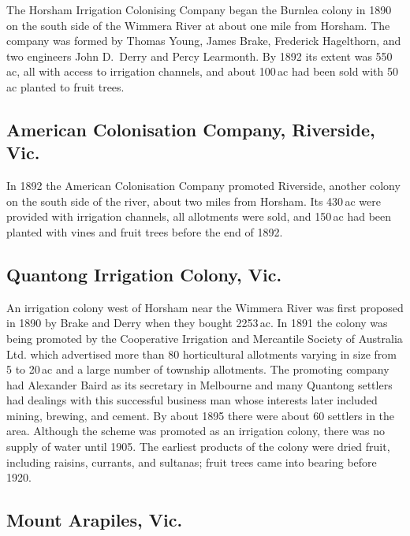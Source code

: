 The Horsham Irrigation Colonising Company began the Burnlea colony in
1890 on the south side of the Wimmera River at about one mile from
Horsham.  The company was formed by Thomas Young, James Brake,
Frederick Hagelthorn, and two engineers John D.~Derry and Percy
Learmonth.  By 1892 its extent was 550\,ac, all with access to
irrigation channels, and about 100\,ac had been sold with 50\,ac
planted to fruit trees.

\subsection*{American Colonisation Company, Riverside, Vic.}

In 1892 the American Colonisation Company promoted Riverside, another
colony on the south side of the river, about two miles from Horsham.
Its 430\,ac were provided with irrigation channels, all allotments
were sold, and 150\,ac had been planted with vines and fruit trees
before the end of 1892.

\subsection*{Quantong Irrigation Colony, Vic.}

An irrigation colony west of Horsham near the Wimmera River was first
proposed in 1890 by Brake and Derry when they bought 2253\,ac.  In
1891 the colony was being promoted by the Cooperative Irrigation and
Mercantile Society of Australia Ltd. which advertised more than 80
horticultural allotments varying in size from 5 to 20\,ac and a large
number of township allotments.  The promoting company had Alexander
Baird as its secretary in Melbourne and many Quantong settlers had
dealings with this successful business man whose interests later
included mining, brewing, and cement.  By about 1895 there were about
60 settlers in the area.  Although the scheme was promoted as an
irrigation colony, there was no supply of water until 1905.  The
earliest products of the colony were dried fruit, including raisins,
currants, and sultanas; fruit trees came into bearing before
1920.

\subsection*{Mount Arapiles, Vic.}

